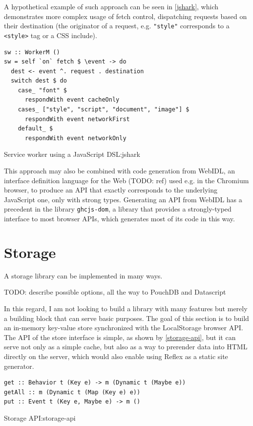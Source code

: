 \documentclass[english,odsaz]{fitthesis}
\begin{document}
A hypothetical example of such approach can be seen in
\ref{jshark}, which demonstrates more complex usage of fetch control, dispatching
requests based on their destination (the originator of a request, e.g. \texttt{"style"}
corresponds to a \texttt{<style>} tag or a CSS include).

\begin{listing}[htbp]
\begin{verbatim}
sw :: WorkerM ()
sw = self `on` fetch $ \event -> do
  dest <- event ^. request . destination
  switch dest $ do
    case_ "font" $
      respondWith event cacheOnly
    cases_ ["style", "script", "document", "image"] $
      respondWith event networkFirst
    default_ $
      respondWith event networkOnly
\end{verbatim}
\caption{Service worker using a JavaScript DSL:jshark}
\end{listing}

This approach may also be combined with code generation from WebIDL, an
interface definition language for the Web (TODO: ref) used e.g. in the Chromium
browser, to produce an API that exactly corresponds to the underlying JavaScript
one, only with strong types. Generating an API from WebIDL has a precedent in
the library \texttt{ghcjs-dom}, a library that provides a strongly-typed interface to
most browser APIs, which generates most of its code in this way.

\section{Storage}
\label{sec:org9b455bb}
A storage library can be implemented in many ways.

TODO: describe possible options, all the way to PouchDB and Datascript

In this regard, I am not looking to build a library with many features but
merely a building block that can serve basic purposes. The goal of this section
is to build an in-memory key-value store synchronized with the LocalStorage
browser API. The API of the store interface is simple, as shown by
\ref{storage-api}, but it can serve not only as a simple cache, but also as a way
to prerender data into HTML directly on the server, which would also enable
using Reflex as a static site generator.

\begin{listing}[htbp]
\begin{verbatim}
get :: Behavior t (Key e) -> m (Dynamic t (Maybe e))
getAll :: m (Dynamic t (Map (Key e) e))
put :: Event t (Key e, Maybe e) -> m ()
\end{verbatim}
\caption{Storage API:storage-api}
\end{listing}
\end{document}
